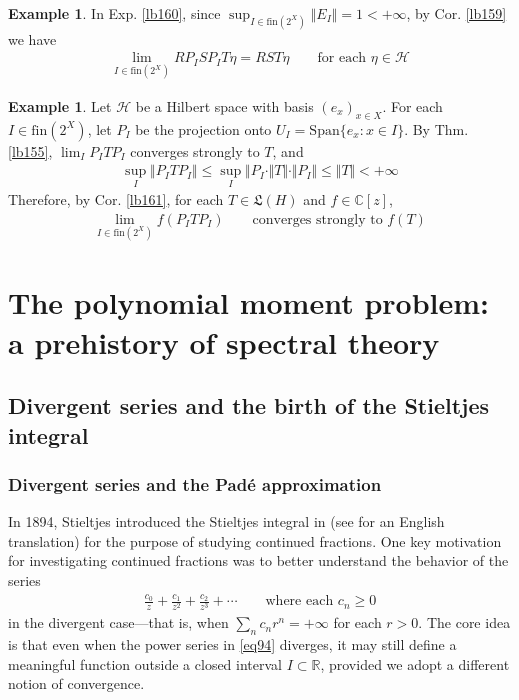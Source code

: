 \documentclass[12pt,b5paper,notitlepage]{article}
\theoremstyle{definition}
\newtheorem{eg}[df]{Example}
\theoremstyle{plain}
\newcommand{\fk}{\mathfrak}
\newcommand{\Span}{\mathrm{Span}}
\newcommand{\Cbb}{\mathbb C}
\newcommand{\Rbb}{\mathbb R}
\newcommand{\fin}{\mathrm{fin}}
\newcommand{\MH}{\mathcal H}
\numberwithin{equation}{section}
\begin{document}
\begin{eg}
In Exp. \ref{lb160}, since $\sup_{I\in\fin(2^X)}\Vert E_I\Vert=1<+\infty$, by Cor. \ref{lb159} we have
\begin{align*}
\lim_{I\in\fin(2^X)}RP_ISP_IT\eta=RST\eta\qquad\text{for each $\eta\in\MH$}
\end{align*}

\end{eg}




\begin{eg}
Let $\MH$ be a Hilbert space with basis $(e_x)_{x\in X}$. For each $I\in\fin(2^X)$, let $P_I$ be the projection onto $U_I=\Span\{e_x:x\in I\}$. By Thm. \ref{lb155}, $\lim_I P_ITP_I$ converges strongly to $T$, and 
\begin{align*}
\sup_I\Vert P_ITP_I\Vert\leq\sup_I \Vert P_I\cdot\Vert T\Vert\cdot\Vert P_I\Vert\leq \Vert T\Vert<+\infty
\end{align*}
Therefore, by Cor. \ref{lb161}, for each $T\in\fk L(H)$ and $f\in\Cbb[z]$, 
\begin{align*}
\lim_{I\in\fin(2^X)} f(P_ITP_I)\qquad\text{converges strongly to }f(T)
\end{align*}
\end{eg}








\newpage



\section{The polynomial moment problem: a prehistory of spectral theory}\label{lb114}


\subsection{Divergent series and the birth of the Stieltjes integral}\label{lb182}


\subsubsection{Divergent series and the Pad\'e approximation}

In 1894, Stieltjes introduced the Stieltjes integral in \cite{Sti94} (see \cite[Vol. II]{Sti-C} for an English translation) for the purpose of studying continued fractions. One key motivation for investigating continued fractions was to better understand the behavior of the series
\begin{align}\label{eq94}
\frac{c_0}{z}+\frac{c_1}{z^2}+\frac{c_2}{z^3}+\cdots\qquad\text{where each }c_n\geq0
\end{align}
in the divergent case---that is, when $\sum_n c_nr^n=+\infty$ for each $r>0$. The core idea is that even when the power series in \eqref{eq94} diverges, it may still define a meaningful function outside a closed interval $I\subset\Rbb$, provided we adopt a different notion of convergence. 
\end{document}
